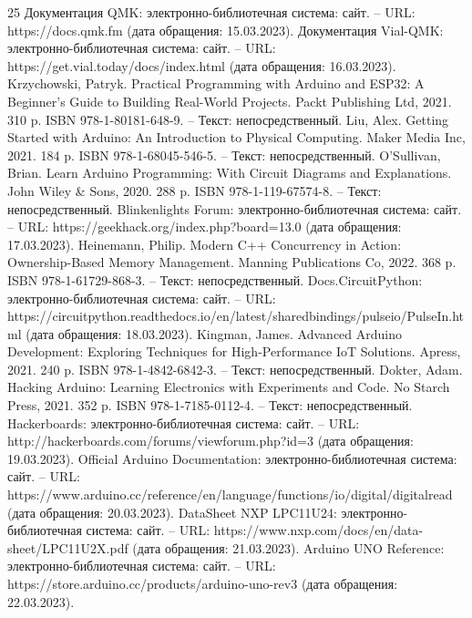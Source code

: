 
\begin{thebibliography}{25}
     Документация QMK: электронно-библиотечная система: сайт. -- URL: https://docs.qmk.fm (дата обращения: 15.03.2023).
     Документация Vial-QMK: электронно-библиотечная система: сайт. -- URL: https://get.vial.today/docs/index.html (дата обращения: 16.03.2023).
     Krzychowski, Patryk. Practical Programming with Arduino and ESP32: A Beginner’s Guide to Building Real-World Projects. Packt Publishing Ltd, 2021. 310 p. ISBN 978-1-80181-648-9. -- Текст: непосредственный.
     Liu, Alex. Getting Started with Arduino: An Introduction to Physical Computing. Maker Media Inc, 2021. 184 p. ISBN 978-1-68045-546-5. -- Текст: непосредственный.
     O’Sullivan, Brian. Learn Arduino Programming: With Circuit Diagrams and Explanations. John Wiley \& Sons, 2020. 288 p. ISBN 978-1-119-67574-8. -- Текст: непосредственный.
     Blinkenlights Forum: электронно-библиотечная система: сайт. -- URL: https://geekhack.org/index.php?board=13.0 (дата обращения: 17.03.2023).
     Heinemann, Philip. Modern C++ Concurrency in Action: Ownership-Based Memory Management. Manning Publications Co, 2022. 368 p. ISBN 978-1-61729-868-3. -- Текст: непосредственный.
     Docs.CircuitPython: электронно-библиотечная система: сайт. -- URL: https://circuitpython.readthedocs.io/en/latest/sharedbindings/pulseio/PulseIn.html (дата обращения: 18.03.2023).
     Kingman, James. Advanced Arduino Development: Exploring Techniques for High-Performance IoT Solutions. Apress, 2021. 240 p. ISBN 978-1-4842-6842-3. -- Текст: непосредственный.
     Dokter, Adam. Hacking Arduino: Learning Electronics with Experiments and Code. No Starch Press, 2021. 352 p. ISBN 978-1-7185-0112-4. -- Текст: непосредственный.
     Hackerboards: электронно-библиотечная система: сайт. -- URL: http://hackerboards.com/forums/viewforum.php?id=3 (дата обращения: 19.03.2023).
     Official Arduino Documentation: электронно-библиотечная система: сайт. -- URL: https://www.arduino.cc/reference/en/language/functions/io/digital/digitalread (дата обращения: 20.03.2023).
     DataSheet NXP LPC11U24: электронно-библиотечная система: сайт. -- URL: https://www.nxp.com/docs/en/data-sheet/LPC11U2X.pdf (дата обращения: 21.03.2023).
     Arduino UNO Reference: электронно-библиотечная система: сайт. -- URL: https://store.arduino.cc/products/arduino-uno-rev3 (дата обращения: 22.03.2023).

\end{thebibliography}
